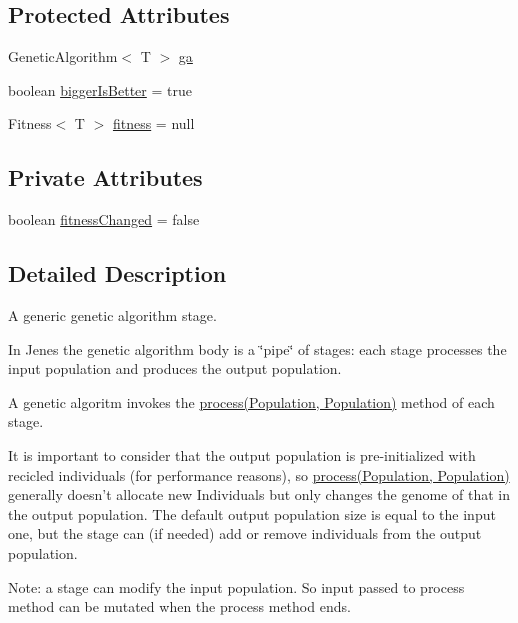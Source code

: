 \subsection*{Protected Attributes}
\begin{DoxyCompactItemize}
\item 
Genetic\-Algorithm$<$ T $>$ \hyperlink{classjenes_1_1stage_1_1_abstract_stage_3_01_t_01extends_01_chromosome_01_4_a751aba4f46b29d22592d48422ffa75f9}{ga}
\item 
boolean \hyperlink{classjenes_1_1stage_1_1_abstract_stage_3_01_t_01extends_01_chromosome_01_4_a11da35af3fe950eef9882b03e13690d4}{bigger\-Is\-Better} = true
\item 
Fitness$<$ T $>$ \hyperlink{classjenes_1_1stage_1_1_abstract_stage_3_01_t_01extends_01_chromosome_01_4_a697ab8239c1ae2a99445cd7f5fbca45d}{fitness} = null
\end{DoxyCompactItemize}
\subsection*{Private Attributes}
\begin{DoxyCompactItemize}
\item 
boolean \hyperlink{classjenes_1_1stage_1_1_abstract_stage_3_01_t_01extends_01_chromosome_01_4_a049a743a79ce2e6d2a4243f85226a59e}{fitness\-Changed} = false
\end{DoxyCompactItemize}


\subsection{Detailed Description}
A generic genetic algorithm stage.\par
 \par
 In Jenes the genetic algorithm body is a \char`\"{}pipe\char`\"{} of stages\-: each stage processes the input population and produces the output population.\par
 A genetic algoritm invokes the \hyperlink{}{process(\-Population, Population)} method of each stage. \par
 It is important to consider that the output population is pre-\/initialized with recicled individuals (for performance reasons), so \hyperlink{}{process(\-Population, Population)} generally doesn't allocate new Individuals but only changes the genome of that in the output population. The default output population size is equal to the input one, but the stage can (if needed) add or remove individuals from the output population. \par
\par
 Note\-: a stage can modify the input population. So input passed to process method can be mutated when the process method ends.


